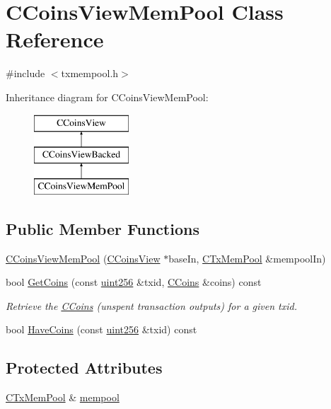 \hypertarget{class_c_coins_view_mem_pool}{}\section{C\+Coins\+View\+Mem\+Pool Class Reference}
\label{class_c_coins_view_mem_pool}


{\ttfamily \#include $<$txmempool.\+h$>$}

Inheritance diagram for C\+Coins\+View\+Mem\+Pool\+:\begin{figure}[H]
\begin{center}
\leavevmode
\includegraphics[height=3.000000cm]{class_c_coins_view_mem_pool}
\end{center}
\end{figure}
\subsection*{Public Member Functions}
\begin{DoxyCompactItemize}
\item 
\hyperlink{class_c_coins_view_mem_pool_aab9a206c304acec322fddf646c7bafb9}{C\+Coins\+View\+Mem\+Pool} (\hyperlink{class_c_coins_view}{C\+Coins\+View} $\ast$base\+In, \hyperlink{class_c_tx_mem_pool}{C\+Tx\+Mem\+Pool} \&mempool\+In)
\item 
bool \hyperlink{class_c_coins_view_mem_pool_a01564f29ff2673ddd0d27414e576f1bc}{Get\+Coins} (const \hyperlink{classuint256}{uint256} \&txid, \hyperlink{class_c_coins}{C\+Coins} \&coins) const 
\begin{DoxyCompactList}\small\item\em Retrieve the \hyperlink{class_c_coins}{C\+Coins} (unspent transaction outputs) for a given txid. \end{DoxyCompactList}\item 
bool \hyperlink{class_c_coins_view_mem_pool_a965e6c8e378fe937620ba2c180d1ed74}{Have\+Coins} (const \hyperlink{classuint256}{uint256} \&txid) const 
\end{DoxyCompactItemize}
\subsection*{Protected Attributes}
\begin{DoxyCompactItemize}
\item 
\hyperlink{class_c_tx_mem_pool}{C\+Tx\+Mem\+Pool} \& \hyperlink{class_c_coins_view_mem_pool_a7a3870fc65376cb311a0b3abb28fec10}{mempool}
\end{DoxyCompactItemize}


